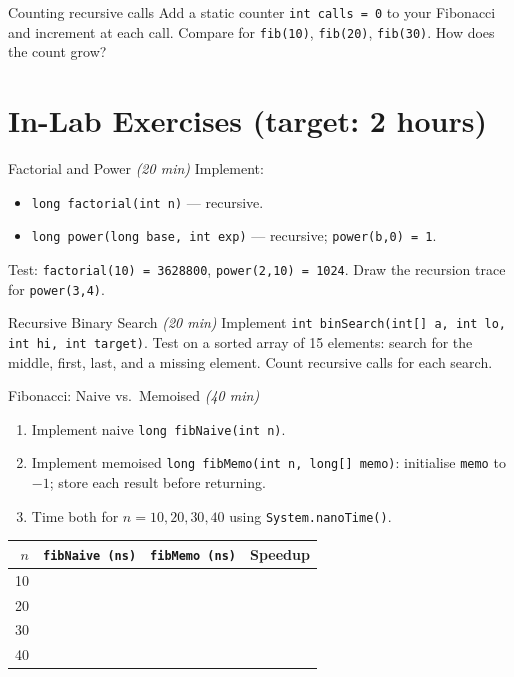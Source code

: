 \documentclass[11pt]{article}
\begin{document}
\begin{tryit}{Counting recursive calls}
Add a static counter \texttt{int calls = 0} to your Fibonacci and increment at each call.
Compare for \texttt{fib(10)}, \texttt{fib(20)}, \texttt{fib(30)}. How does the count grow?
\end{tryit}

\section*{In-Lab Exercises (target: 2 hours)}

\begin{labexercise}{Factorial and Power \hfill {\small \itshape (20 min)}}
Implement:
\begin{itemize}[leftmargin=*,nosep]
  \item \texttt{long factorial(int n)} --- recursive.
  \item \texttt{long power(long base, int exp)} --- recursive; \texttt{power(b,0) = 1}.
\end{itemize}
Test: \texttt{factorial(10) = 3628800}, \texttt{power(2,10) = 1024}.
Draw the recursion trace for \texttt{power(3,4)}.
\end{labexercise}

\begin{labexercise}{Recursive Binary Search \hfill {\small \itshape (20 min)}}
Implement \texttt{int binSearch(int[] a, int lo, int hi, int target)}.
Test on a sorted array of 15 elements: search for the middle, first, last, and a missing element.
Count recursive calls for each search.
\end{labexercise}

\begin{labexercise}{Fibonacci: Naive vs.\ Memoised \hfill {\small \itshape (40 min)}}
\begin{enumerate}[leftmargin=*,nosep]
  \item Implement naive \texttt{long fibNaive(int n)}.
  \item Implement memoised \texttt{long fibMemo(int n, long[] memo)}: initialise \texttt{memo} to $-1$;
        store each result before returning.
  \item Time both for $n = 10, 20, 30, 40$ using \texttt{System.nanoTime()}.
\end{enumerate}
\begin{center}
\begin{tabular}{@{}rrrr@{}}
\toprule
$n$ & \texttt{fibNaive (ns)} & \texttt{fibMemo (ns)} & Speedup \\
\midrule
10 & & & \\ 20 & & & \\ 30 & & & \\ 40 & & & \\
\bottomrule
\end{tabular}
\end{center}
\end{labexercise}
\end{document}
